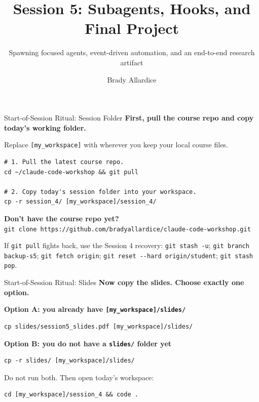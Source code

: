 \documentclass[aspectratio=169, 11pt]{beamer}
\title{Session 5: Subagents, Hooks, and Final Project}
\subtitle{Spawning focused agents, event-driven automation, and an end-to-end research artifact}
\author{Brady Allardice}
\date{}
\institute{UPF \& IBEI}
\begin{document}
\begin{frame}[plain]
  \titlepage
\end{frame}


\begin{frame}[fragile]{Start-of-Session Ritual: Session Folder}
  \textbf{First, pull the course repo and copy today's working folder.}

  \vspace{0.3em}
  {\small Replace \texttt{[my\_workspace]} with wherever you keep your local course files.}

  \vspace{0.4em}
  \begin{lstlisting}[basicstyle=\ttfamily\footnotesize]
# 1. Pull the latest course repo.
cd ~/claude-code-workshop && git pull

# 2. Copy today's session folder into your workspace.
cp -r session_4/ [my_workspace]/session_4/
  \end{lstlisting}

  \vspace{0.4em}
  {\small\textbf{Don't have the course repo yet?}\\
  \texttt{git clone https://github.com/bradyallardice/claude-code-workshop.git}}

  \vspace{0.4em}
  {\small If \texttt{git pull} fights back, use the Session 4 recovery: \texttt{git stash -u}; \texttt{git branch backup-s5}; \texttt{git fetch origin}; \texttt{git reset -{}-hard origin/student}; \texttt{git stash pop}.}
\end{frame}

\begin{frame}[fragile]{Start-of-Session Ritual: Slides}
  \textbf{Now copy the slides. Choose exactly one option.}

  \vspace{0.7em}
  \textbf{Option A: you already have \texttt{[my\_workspace]/slides/}}
  \begin{lstlisting}[basicstyle=\ttfamily\footnotesize]
cp slides/session5_slides.pdf [my_workspace]/slides/
  \end{lstlisting}

  \vspace{0.7em}
  \textbf{Option B: you do not have a \texttt{slides/} folder yet}
  \begin{lstlisting}[basicstyle=\ttfamily\footnotesize]
cp -r slides/ [my_workspace]/slides/
  \end{lstlisting}

  \vspace{0.7em}
  \alert{Do not run both.} Then open today's workspace:
  \begin{lstlisting}[basicstyle=\ttfamily\footnotesize]
cd [my_workspace]/session_4 && code .
  \end{lstlisting}
\end{frame}
\end{document}
